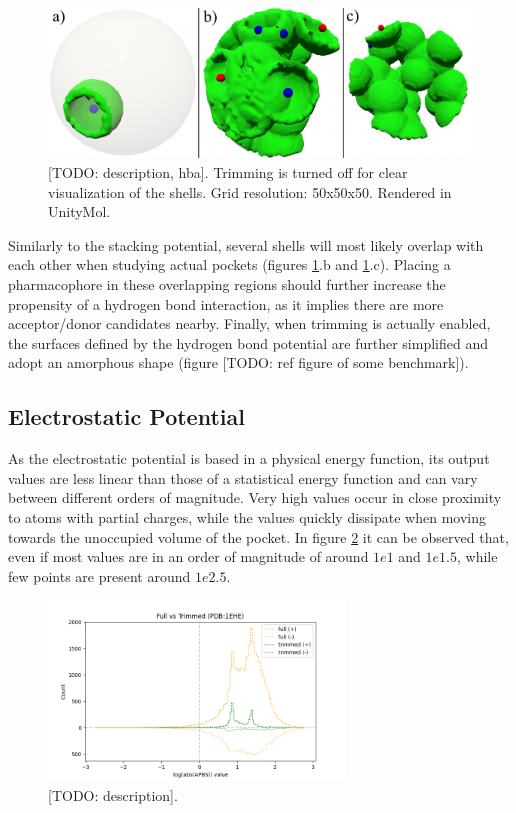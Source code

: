     \begin{figure}[H]
      \centering
      \includegraphics[width=1\textwidth]{figures/results/visualize_hbonds.png}
      \caption{\label{fig:results/visualize_hbonds} [TODO: description, hba]. Trimming is turned off for clear visualization of the shells. Grid resolution: 50x50x50. Rendered in UnityMol.}
    \end{figure}

    Similarly to the stacking potential, several shells will most likely overlap with each other when studying actual pockets (figures \ref{fig:results/visualize_hbonds}.b and \ref{fig:results/visualize_hbonds}.c). Placing a pharmacophore in these overlapping regions should further increase the propensity of a hydrogen bond interaction, as it implies there are more acceptor/donor candidates nearby. Finally, when trimming is actually enabled, the surfaces defined by the hydrogen bond potential are further simplified and adopt an amorphous shape (figure [TODO: ref figure of some benchmark]).

  \subsection{Electrostatic Potential}
    As the electrostatic potential is based in a physical energy function, its output values are less linear than those of a statistical energy function and can vary between different orders of magnitude. Very high values occur in close proximity to atoms with partial charges, while the values quickly dissipate when moving towards the unoccupied volume of the pocket. In figure \ref{fig:results/logapbs_trimming} it can be observed that, even if most values are in an order of magnitude of around $1e1$ and $1e1.5$, while few points are present around $1e2.5$.

    \begin{figure}[H]
      \centering
      \includegraphics[width=0.7\textwidth]{figures/results/logapbs_trimming.png}
      \caption{\label{fig:results/logapbs_trimming} [TODO: description].}
    \end{figure}

